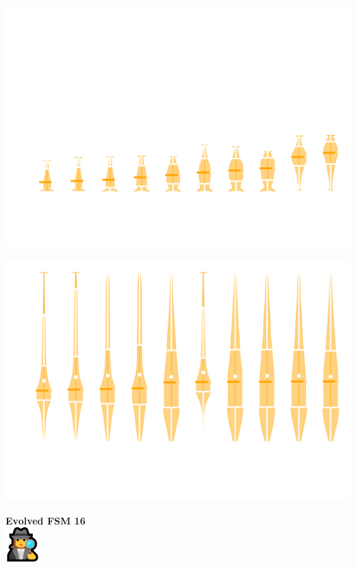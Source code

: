 \documentclass{beamer}
\begin{document}
\begin{frame}
    \begin{center}
        \includegraphics[width=.8\textwidth]{static/performances_probabilistic_ending.png}
    \end{center}
\end{frame}

\begin{frame}
    \begin{center}
        \includegraphics[width=.8\textwidth]{static/performances_noisy_probabilistic_ending.png}
    \end{center}
\end{frame}

\begin{frame}
    \begin{center}
    \Large{\textbf{Evolved FSM 16}} \\ \vspace{1cm}
    \includegraphics[width=0.1\textwidth]{static/detective.png}
    \end{center}
\end{frame}
\end{document}
